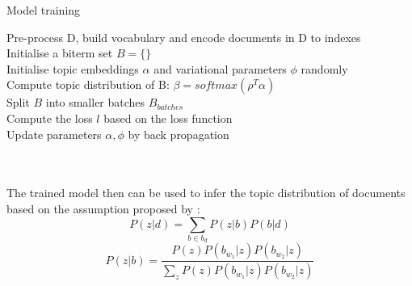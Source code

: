 \begin{algorithm}[!htbp]
    \caption{Model training}
    \label{alg:ebtm}
    \LinesNumbered 
    Pre-process D, build vocabulary and encode documents in D to indexes \\
    Initialise a biterm set $B = \{\}$ \\
    Initialise topic embeddings $\alpha$ and variational parameters $\phi$ randomly \\
    {
        Compute topic distribution of B: $\beta = softmax(\rho^T\alpha) $\\
        Split $B$ into smaller batches $B_{batches}$\\
        Compute the loss $l$ based on the loss function \\
        Update parameters $\alpha, \phi$ by back propagation
    }
\end{algorithm}
\\\\The trained model then can be used to infer the topic distribution of documents based on the assumption proposed by \cite{yan2013biterm}:
\begin{equation}
    P(z|d) = \sum_{b\in b_d}P(z|b)P(b|d)
\label{eq:doc1}
\end{equation}
\begin{equation}
    P(z|b) = \frac{P(z)P(b_{w_1}|z)P(b_{w_2}|z)}{\sum_zP(z)P(b_{w_1}|z)P(b_{w_2}|z)}
\label{eq:doc2}
\end{equation}
